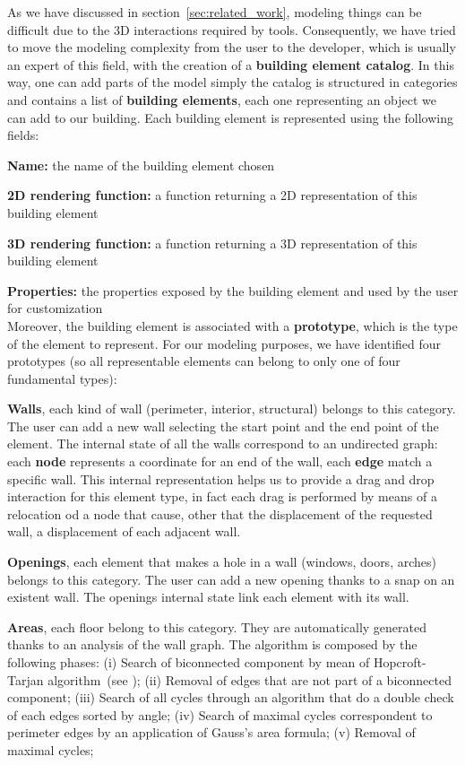 As we have discussed in section~\ref{sec:related_work}, modeling things can be difficult due to the 3D interactions required by tools. Consequently, we have tried to move the modeling complexity from the user to the developer, which is usually an expert of this field, with the creation of a \textbf{building element catalog}. In this way, one can add parts of the model simply  the catalog is structured in categories and contains a list of \textbf{building elements}, each one representing an object we can add to our building. Each building element is represented using the following fields:

\textbf{Name:} the name of the building element chosen

\textbf{2D rendering function:} a function returning a 2D representation of this building element

\textbf{3D rendering function:} a function returning a 3D representation of this building element

\textbf{Properties:} the properties exposed by the building element and used by the user for customization\\

Moreover, the building element is associated with a \textbf{prototype}, which is the type of the element to represent. For our modeling purposes, we have identified four prototypes (so all representable elements can belong to only one of four fundamental types):

\textbf{Walls}, each kind of wall (perimeter, interior, structural) belongs to this category. The user can add a new wall selecting the start point and the end point of the element. The internal state of all the walls correspond to an undirected graph: each \textbf{node} represents a coordinate for an end of the wall, each \textbf{edge} match a specific wall. This internal representation helps us to provide a drag and drop interaction for this element type, in fact each drag is performed by means of a relocation od a node that cause, other that the displacement of the requested wall, a displacement of each adjacent wall.

\textbf{Openings}, each element that makes a hole in a wall (windows, doors, arches) belongs to this category. The user can add a new opening thanks to a snap on an existent wall. The openings internal state link each element with its wall.

\textbf{Areas}, each floor belong to this category. They are automatically generated thanks to an analysis of the wall graph. The algorithm is composed by the following phases: (i) Search of biconnected component by mean of Hopcroft-Tarjan algorithm~(see \cite{Hopcroft:1973:AEA:362248.362272}); (ii) Removal of edges that are not part of a biconnected component; (iii) Search of all cycles through an algorithm that do a double check of each edges sorted by angle; (iv) Search of maximal cycles correspondent to perimeter edges by an application of Gauss's area formula; (v) Removal of maximal cycles;

